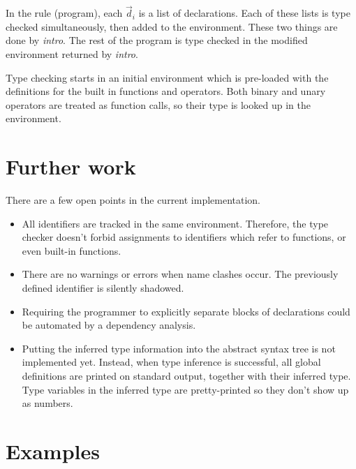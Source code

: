 \documentclass[a4paper]{article}
\begin{document}
In the rule (program), each $\vec{d}_i$ is a list of declarations.  Each of
these lists is type checked simultaneously, then added to the environment.
These two things are done by \emph{intro}.  The rest of the program is type
checked in the modified environment returned by \emph{intro}.

Type checking starts in an initial environment which is pre-loaded with the
definitions for the built in functions and operators.  Both binary and unary
operators are treated as function calls, so their type is looked up in the
environment.

\section{Further work}

There are a few open points in the current implementation.

\begin{itemize}

  \item All identifiers are tracked in the same environment.  Therefore, the
  type checker doesn't forbid assignments to identifiers which refer to
  functions, or even built-in functions.

  \item There are no warnings or errors when name clashes occur.  The previously
  defined identifier is silently shadowed.

  \item Requiring the programmer to explicitly separate blocks of declarations
  could be automated by a dependency analysis.

  \item Putting the inferred type information into the abstract syntax tree is
  not implemented yet.  Instead, when type inference is successful, all global
  definitions are printed on standard output, together with their inferred type.
  Type variables in the inferred type are pretty-printed so they don't show up
  as numbers.

\end{itemize}


\section{Examples}
\end{document}
